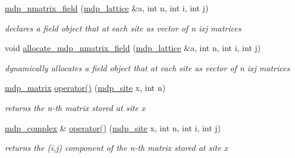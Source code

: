 \begin{CompactItemize}
\item 
\hypertarget{classmdp__nmatrix__field_10d00272d103d471a1cd9e5921d39419}{
\hyperlink{classmdp__nmatrix__field_10d00272d103d471a1cd9e5921d39419}{mdp\_\-nmatrix\_\-field} (\hyperlink{classmdp__lattice}{mdp\_\-lattice} \&a, int n, int i, int j)}
\label{classmdp__nmatrix__field_10d00272d103d471a1cd9e5921d39419}

\begin{CompactList}\small\item\em declares a field object that at each site as vector of n ixj matrices \item\end{CompactList}\item 
\hypertarget{classmdp__nmatrix__field_d8803e7b0f9a755329a1d7335ac0c019}{
void \hyperlink{classmdp__nmatrix__field_d8803e7b0f9a755329a1d7335ac0c019}{allocate\_\-mdp\_\-nmatrix\_\-field} (\hyperlink{classmdp__lattice}{mdp\_\-lattice} \&a, int n, int i, int j)}
\label{classmdp__nmatrix__field_d8803e7b0f9a755329a1d7335ac0c019}

\begin{CompactList}\small\item\em dynamically allocates a field object that at each site as vector of n ixj matrices \item\end{CompactList}\item 
\hypertarget{classmdp__nmatrix__field_389126da9ddf86d42b27d4d9d20245f8}{
\hyperlink{classmdp__matrix}{mdp\_\-matrix} \hyperlink{classmdp__nmatrix__field_389126da9ddf86d42b27d4d9d20245f8}{operator()} (\hyperlink{classmdp__site}{mdp\_\-site} x, int n)}
\label{classmdp__nmatrix__field_389126da9ddf86d42b27d4d9d20245f8}

\begin{CompactList}\small\item\em returns the n-th matrix stored at site x \item\end{CompactList}\item 
\hypertarget{classmdp__nmatrix__field_b166e6abe76fcafd63dec9739da8324c}{
\hyperlink{classmdp__complex}{mdp\_\-complex} \& \hyperlink{classmdp__nmatrix__field_b166e6abe76fcafd63dec9739da8324c}{operator()} (\hyperlink{classmdp__site}{mdp\_\-site} x, int n, int i, int j)}
\label{classmdp__nmatrix__field_b166e6abe76fcafd63dec9739da8324c}

\begin{CompactList}\small\item\em returns the (i,j) component of the n-th matrix stored at site x \item\end{CompactList}\end{CompactItemize}


